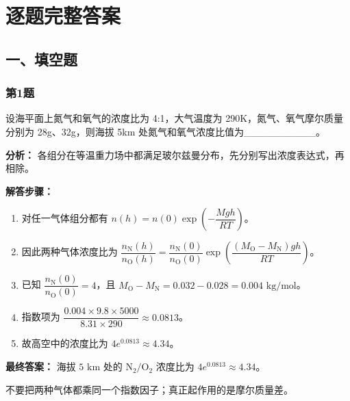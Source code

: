 \documentclass[12pt,a4paper]{ctexart}
\begin{document}
\section{逐题完整答案}
\subsection*{一、填空题}

\subsubsection*{第1题}
\begin{tcolorbox}[colback=gray!2!white,colframe=black!60,title={题目}]
设海平面上氮气和氧气的浓度比为 4:1，大气温度为 290K，氮气、氧气摩尔质量分别为 28g、32g，则海拔 5km 处氮气和氧气浓度比值为\_\_\_\_\_\_\_\_\_\_。\par
\end{tcolorbox}
\begin{tcolorbox}[colback=blue!2!white,colframe=blue!55!black,title={完整答案}]
\textbf{分析：}
各组分在等温重力场中都满足玻尔兹曼分布，先分别写出浓度表达式，再相除。\par
\textbf{解答步骤：}
\begin{enumerate}
\item 对任一气体组分都有 \(n(h)=n(0)\exp\!\left(-\dfrac{Mgh}{RT}\right)\)。
\item 因此两种气体浓度比为 \(\dfrac{n_{\mathrm N}(h)}{n_{\mathrm O}(h)}=\dfrac{n_{\mathrm N}(0)}{n_{\mathrm O}(0)}\exp\!\left(\dfrac{(M_{\mathrm O}-M_{\mathrm N})gh}{RT}\right)\)。
\item 已知 \(\dfrac{n_{\mathrm N}(0)}{n_{\mathrm O}(0)}=4\)，且 \(M_{\mathrm O}-M_{\mathrm N}=0.032-0.028=0.004\text{ kg/mol}\)。
\item 指数项为 \(\dfrac{0.004\times 9.8\times 5000}{8.31\times 290}\approx 0.0813\)。
\item 故高空中的浓度比为 \(4e^{0.0813}\approx 4.34\)。
\end{enumerate}
\textbf{最终答案：}
海拔 \(5\text{ km}\) 处的 \(\mathrm N_2/\mathrm O_2\) 浓度比为 \(4e^{0.0813}\approx 4.34\)。\par
\end{tcolorbox}
\begin{tcolorbox}[colback=red!2!white,colframe=red!55!black,title={易错点}]
不要把两种气体都乘同一个指数因子；真正起作用的是摩尔质量差。\par
\end{tcolorbox}
\end{document}
